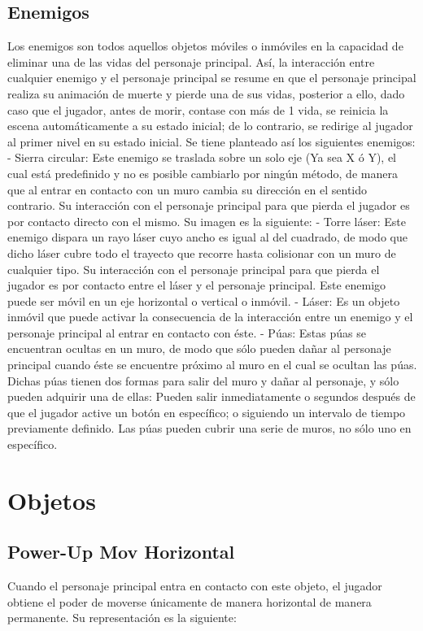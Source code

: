 \documentclass{article}
\begin{document}
\subsection{Enemigos}
Los enemigos son todos aquellos objetos móviles o inmóviles en la capacidad de eliminar una de las vidas del personaje principal. Así, la interacción entre cualquier enemigo y el personaje principal se resume en que el personaje principal realiza su animación de muerte y pierde una de sus vidas, posterior a ello, dado caso que el jugador, antes de morir, contase con más de 1 vida, se reinicia la escena automáticamente a su estado inicial; de lo contrario, se redirige al jugador al primer nivel en su estado inicial.
Se tiene planteado así los siguientes enemigos:
    - Sierra circular: Este enemigo se traslada sobre un solo eje (Ya sea X ó Y), el cual está predefinido y no es posible cambiarlo por ningún método, de manera que al entrar en contacto con un muro cambia su dirección en el sentido contrario. Su interacción con el personaje principal para que pierda el jugador es por contacto directo con el mismo. Su imagen es la siguiente:
    - Torre láser: Este enemigo dispara un rayo láser cuyo ancho es igual al del cuadrado, de modo que dicho láser cubre todo el trayecto que recorre hasta colisionar con un muro de cualquier tipo. Su interacción con el personaje principal para que pierda el jugador es por contacto entre el láser y el personaje principal. Este enemigo puede ser móvil en un eje horizontal o vertical o inmóvil.
    - Láser: Es un objeto inmóvil que puede activar la consecuencia de la interacción entre un enemigo y el personaje principal al entrar en contacto con éste.
    - Púas: Estas púas se encuentran ocultas en un muro, de modo que sólo pueden dañar al personaje principal cuando éste se encuentre próximo al muro en el cual se ocultan las púas. Dichas púas tienen dos formas para salir del muro y dañar al personaje, y sólo pueden adquirir una de ellas: Pueden salir inmediatamente o segundos después de que el jugador active un botón en específico; o siguiendo un intervalo de tiempo previamente definido. Las púas pueden cubrir una serie de muros, no sólo uno en específico.
\section{Objetos}
\subsection{Power-Up Mov Horizontal}
Cuando el personaje principal entra en contacto con este objeto, el jugador obtiene el poder de moverse únicamente de manera horizontal de manera permanente. Su representación es la siguiente:
\end{document}
